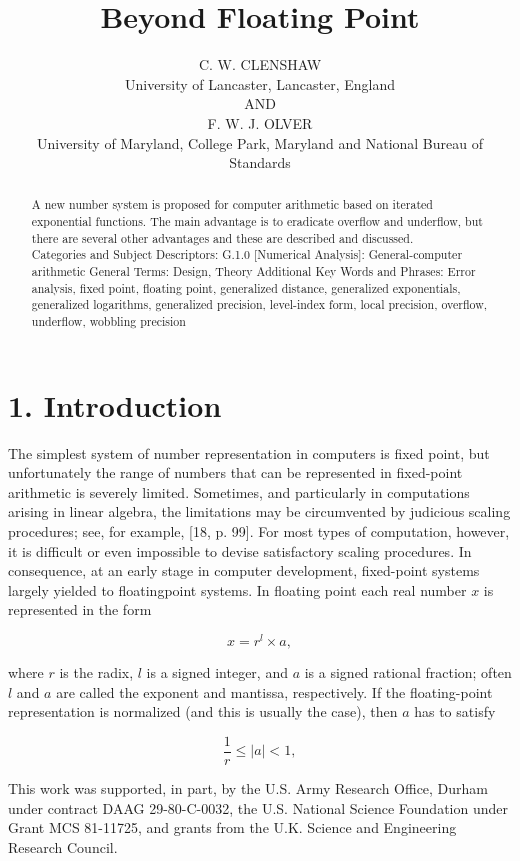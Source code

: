 \documentclass[10pt]{article}
\title{Beyond Floating Point }
\author{C. W. CLENSHAW\\
University of Lancaster, Lancaster, England\\
AND\\
F. W. J. OLVER\\
University of Maryland, College Park, Maryland and National Bureau of Standards}
\date{}
\begin{document}
\maketitle


\begin{abstract}
A new number system is proposed for computer arithmetic based on iterated exponential functions. The main advantage is to eradicate overflow and underflow, but there are several other advantages and these are described and discussed.\\[0pt]
Categories and Subject Descriptors: G.1.0 [Numerical Analysis]: General-computer arithmetic General Terms: Design, Theory Additional Key Words and Phrases: Error analysis, fixed point, floating point, generalized distance, generalized exponentials, generalized logarithms, generalized precision, level-index form, local precision, overflow, underflow, wobbling precision
\end{abstract}

\section*{1. Introduction}
The simplest system of number representation in computers is fixed point, but unfortunately the range of numbers that can be represented in fixed-point arithmetic is severely limited. Sometimes, and particularly in computations arising in linear algebra, the limitations may be circumvented by judicious scaling procedures; see, for example, [18, p. 99]. For most types of computation, however, it is difficult or even impossible to devise satisfactory scaling procedures. In consequence, at an early stage in computer development, fixed-point systems largely yielded to floatingpoint systems. In floating point each real number $x$ is represented in the form

$$
x=r^{l} \times a,
$$

where $r$ is the radix, $l$ is a signed integer, and $a$ is a signed rational fraction; often $l$ and $a$ are called the exponent and mantissa, respectively. If the floating-point representation is normalized (and this is usually the case), then $a$ has to satisfy

$$
\frac{1}{r} \leq|a|<1,
$$

This work was supported, in part, by the U.S. Army Research Office, Durham under contract DAAG 29-80-C-0032, the U.S. National Science Foundation under Grant MCS 81-11725, and grants from the U.K. Science and Engineering Research Council.
\end{document}
